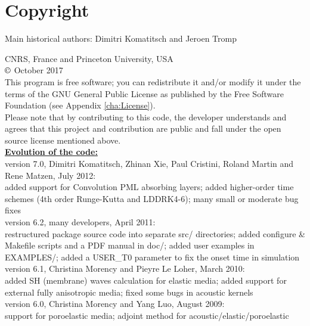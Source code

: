 
\chapter*{Copyright}

Main historical authors: Dimitri Komatitsch and Jeroen Tromp

CNRS, France and Princeton University, USA\\
$\copyright$ October 2017\\

\noindent
This program is free software; you can redistribute it and/or modify
it under the terms of the GNU General Public License as published
by the Free Software Foundation (see Appendix \ref{cha:License}).\\

\noindent
Please note that by contributing to this code, the developer understands and agrees that this project and contribution
are public and fall under the open source license mentioned above.\\

\noindent
\textbf{\underline{Evolution of the code:}}\\

version 7.0, Dimitri Komatitsch, Zhinan Xie, Paul Cristini, Roland Martin and Rene Matzen, July 2012:\\
added support for Convolution PML absorbing layers;
added higher-order time schemes (4th order Runge-Kutta and LDDRK4-6);
many small or moderate bug fixes\\

version 6.2, many developers, April 2011:\\
restructured package source code into separate src/ directories;
added configure \& Makefile scripts and a PDF manual in doc/;
added user examples in EXAMPLES/;
added a USER\_T0 parameter to fix the onset time in simulation\\

version 6.1, Christina Morency and Pieyre Le Loher, March 2010:\\
added SH (membrane) waves calculation for elastic media;
added support for external fully anisotropic media;
fixed some bugs in acoustic kernels\\

version 6.0, Christina Morency and Yang Luo, August 2009:\\
support for poroelastic media;
adjoint method for acoustic/elastic/poroelastic\\

